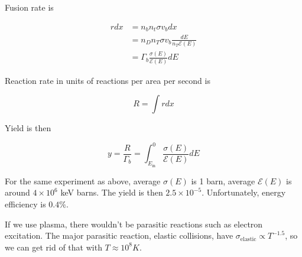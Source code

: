 \documentclass[12pt]{article}
\begin{document}
Fusion rate is

\begin{align*}
    rdx &= n_bn_t\sigma v_bdx \\
        &= n_Dn_T\sigma v_b \frac{dE}{n_T\mathcal E(E)} \\
        &= \Gamma_b \frac{\sigma(E)}{\mathcal E(E)} dE
\end{align*}

Reaction rate in units of reactions per area per second is

$$R = \int rdx$$

Yield is then

$$y = \frac{R}{\Gamma_b} = \int_{E_\text{in}}^0 \frac{\sigma(E)}{\mathcal E(E)} dE$$

\begin{ex}
    For the same experiment as above, average $\sigma(E)$ is 1 barn, average $\mathcal E(E)$ is around $4\times10^6$ keV barns. The yield is then $2.5 \times 10^{-5}$. Unfortunately, energy efficiency is $0.4\%$.
\end{ex}

If we use plasma, there wouldn't be parasitic reactions such as electron excitation. The major parasitic reaction, elastic collisions, have $\sigma_{\text{elastic}} \propto T^{-1.5}$, so we can get rid of that with $T \approx 10^8 \unit{K}$.
\end{document}
